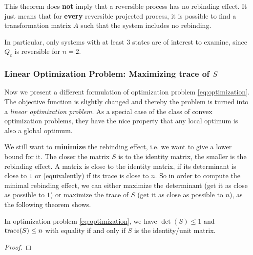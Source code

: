 This theorem does \textbf{not} imply that a reversible process has no rebinding effect. It just means that for \textbf{every} reversible projected process, it is possible to find a transformation matrix $A$ such that the system includes no rebinding.

In particular, only systems with at least $3$ states are of interest to examine, since $Q_c$ is reversible for $n=2$.


\subsubsection*{Linear Optimization Problem: Maximizing trace of $S$}
Now we present a different formulation of optimization problem \eqref{eq:optimization}. The objective function is slightly changed and thereby the problem is turned into a \textit{linear optimization problem}.
As a special case of the class of convex optimization problems, they have the nice property that any local optimum is also a global optimum. 

We still want to \textbf{minimize} the rebinding effect, i.e. we want to give a lower bound for it. The closer the matrix $S$ is to the identity matrix, the smaller is the rebinding effect.
A matrix is close to the identity matrix, if its determinant is close to $1$ or (equivalently) if its trace is close to $n$.
So in order to compute the minimal rebinding effect, we can either maximize the determinant (get it as close as possible to $1$) or maximize the trace of $S$ (get it as close as possible to $n$), as the following theorem shows.
\begin{thm}
In optimization problem \eqref{eq:optimization}, we have $\det(S) \leq 1$ and $\mathrm{trace}(S) \leq n$ with equality if and only if $S$ is the identity/unit matrix.
\end{thm}
\begin{proof}
\end{proof}

